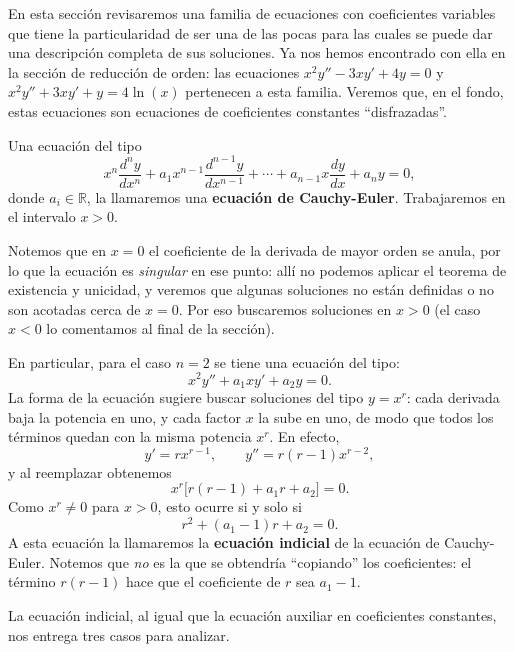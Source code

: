 En esta secci\'on revisaremos una familia de ecuaciones con coeficientes variables que tiene la particularidad de ser una de las pocas para las cuales se puede dar una descripci\'on completa de sus soluciones. Ya nos hemos encontrado con ella en la secci\'on de reducci\'on de orden: las ecuaciones $x^2y''-3xy'+4y=0$ y $x^2y''+3xy'+y=4\ln(x)$ pertenecen a esta familia. Veremos que, en el fondo, estas ecuaciones son ecuaciones de coeficientes constantes ``disfrazadas''.

\begin{definition}
    Una ecuaci\'on del tipo
    \[
    x^n\dfrac{d^ny}{dx^n}+a_1x^{n-1}\dfrac{d^{n-1}y}{dx^{n-1}}+\cdots+a_{n-1}x\dfrac{dy}{dx}+a_ny=0,
    \]
    donde $a_i\in \mathbb{R}$, la llamaremos una \textbf{ecuaci\'on de Cauchy-Euler}. Trabajaremos en el intervalo $x>0$.
\end{definition}

Notemos que en $x=0$ el coeficiente de la derivada de mayor orden se anula, por lo que la ecuaci\'on es \emph{singular} en ese punto: all\'i no podemos aplicar el teorema de existencia y unicidad, y veremos que algunas soluciones no est\'an definidas o no son acotadas cerca de $x=0$. Por eso buscaremos soluciones en $x>0$ (el caso $x<0$ lo comentamos al final de la secci\'on).

\begin{remark}
    En particular, para el caso $n=2$ se tiene una ecuaci\'on del tipo:
    \[
    x^2y''+a_1xy'+a_2y=0.
    \]
    La forma de la ecuaci\'on sugiere buscar soluciones del tipo $y=x^r$: cada derivada baja la potencia en uno, y cada factor $x$ la sube en uno, de modo que todos los t\'erminos quedan con la misma potencia $x^r$. En efecto,
    \[
    y'=rx^{r-1},\qquad y''=r(r-1)x^{r-2},
    \]
    y al reemplazar obtenemos
    \[
    x^r\big[r(r-1)+a_1r+a_2\big]=0.
    \]
    Como $x^r\neq0$ para $x>0$, esto ocurre si y solo si
    \[
    r^2+(a_1-1)r+a_2=0.
    \]
    A esta ecuaci\'on la llamaremos la \textbf{ecuaci\'on indicial} de la ecuaci\'on de Cauchy-Euler. Notemos que \emph{no} es la que se obtendr\'ia ``copiando'' los coeficientes: el t\'ermino $r(r-1)$ hace que el coeficiente de $r$ sea $a_1-1$.
\end{remark}

La ecuaci\'on indicial, al igual que la ecuaci\'on auxiliar en coeficientes constantes, nos entrega tres casos para analizar.

